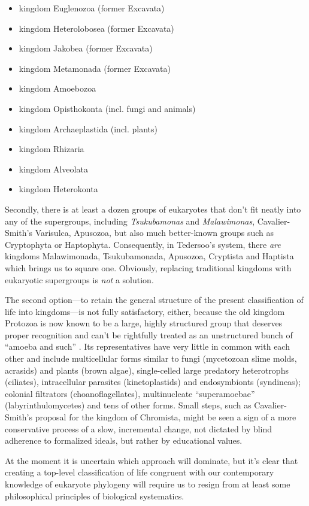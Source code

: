 \begin{artengenv}
\begin{itemize}
\item kingdom Euglenozoa (former Excavata)
\item kingdom Heterolobosea (former Excavata)
\item kingdom Jakobea (former Excavata)
\item kingdom Metamonada (former Excavata)
\item kingdom Amoebozoa
\item kingdom Opisthokonta (incl. fungi and animals)
\item kingdom Archaeplastida (incl. plants)
\item kingdom Rhizaria
\item kingdom Alveolata
\item kingdom Heterokonta
\end{itemize}
Secondly, there is at least a dozen groups of eukaryotes that don’t fit neatly into any of the supergroups, including
\textit{Tsukubamonas} and \textit{Malawimonas}, Cavalier-Smith’s Varisulca, Apusozoa, but also much better-known groups
such as Cryptophyta or Haptophyta. Consequently, in Tedersoo’s system, there \textit{are} kingdoms Malawimonada,
Tsukubamonada, Apusozoa, Cryptista and Haptista which brings us to square one. Obviously, replacing traditional
kingdoms with eukaryotic supergroups is \textit{not }a solution.

The second option---to retain the general structure of the present classification of life into kingdoms---is not fully
satisfactory, either, because the old kingdom Protozoa is now known to be a large, highly structured group that
deserves proper recognition and can’t be rightfully treated as an unstructured bunch of ``amoeba and such''
\parencite[see][]{patterson_diversity_1999}.
Its representatives have very little in common with each other and
include multicellular forms similar to fungi (mycetozoan slime molds, acrasids) and plants (brown algae), single-celled
large predatory heterotrophs (ciliates), intracellular parasites (kinetoplastids) and endosymbionts (syndineas);
colonial filtrators (choanoflagellates), multinucleate ``superamoebae'' (labyrinthulomycetes) and tens of other forms.
Small steps, such as Cavalier-Smith’s proposal for the kingdom of Chromista, might be seen a sign of a more
conservative process of a slow, incremental change, not dictated by blind adherence to formalized ideals, but rather by
educational values.

At the moment it is uncertain which approach will dominate, but it’s clear that creating a top-level classification of
life congruent with our contemporary knowledge of eukaryote phylogeny will require us to resign from at least some
philosophical principles of biological systematics.

\end{artengenv}